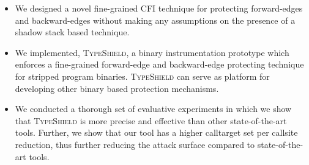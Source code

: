 \label{Contribution}
\begin{itemize}
[leftmargin=.35cm]

 \item 
 We designed a novel fine-grained CFI technique for protecting forward-edges and backward-edges 
 without making any assumptions on the presence of a shadow stack based technique.
 
 \item 
 We implemented, \textsc{TypeShield}, a binary instrumentation prototype which enforces a fine-grained forward-edge and backward-edge protecting technique
 for stripped program binaries. \textsc{TypeShield} can serve as platform for developing other binary based protection mechanisms.
 
 \item 
 We conducted a thorough set of evaluative experiments in which we show that \textsc{TypeShield} is more precise and effective than 
 other state-of-the-art tools. Further, we show that our tool has a higher calltarget set per callsite reduction, thus 
 further reducing the attack surface compared to state-of-the-art tools.
 
\end{itemize}

